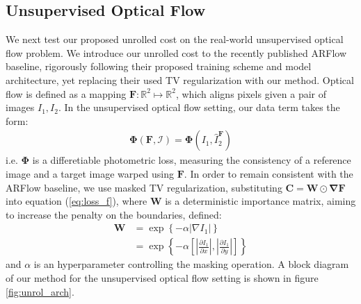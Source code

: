 \documentclass[10pt,twocolumn,letterpaper]{article}
\begin{document}
\subsection{Unsupervised Optical Flow} \label{sec:of}
We next test our proposed unrolled cost on the real-world unsupervised optical flow problem. We introduce our unrolled cost to the recently published ARFlow \cite{liu2020learning} baseline, rigorously following their proposed training scheme and model architecture, yet replacing their used TV regularization with our method. Optical flow is defined as a mapping $\mathbf{F}:\mathbb{R}^2 \mapsto \mathbb{R}^2$, which aligns pixels given a pair of images $I_1,I_2$. In the unsupervised optical flow setting, our data term takes the form:
\begin{equation}
\begin{aligned}
    \mathbf{\Phi}\left( \mathbf{F},\mathcal{I} \right) = \mathbf{\Phi}\left( I_1,\hat{I}_2^{\mathbf{F}} \right) \label{eq:data_flow}
\end{aligned}
\end{equation}
i.e. $\mathbf{\Phi}$ is a differetiable photometric loss, measuring the consistency of a reference image and a target image warped using $\mathbf{F}$. In order to remain consistent with the ARFlow baseline, we use masked TV regularization, substituting $\mathbf{C=W\odot\nabla F}$ into equation (\ref{eq:loss_f}), where $\mathbf{W}$ is a deterministic importance matrix, aiming to increase the penalty on the boundaries, defined: 
\begin{equation} \label{eq:mask}
\begin{aligned}
    \mathbf{W}&=\exp\left\{-\alpha|\nabla I_1|\right\} \\
    &=\exp\left\{-\alpha\left[\left|\frac{\partial  I_1}{\partial x}\right|,\left|\frac{\partial I_1}{\partial y} \right|\right]\right\}
\end{aligned}
\end{equation}
and $\alpha$ is an hyperparameter controlling the masking operation. A block diagram of our method for the unsupervised optical flow setting is shown in figure \ref{fig:unrol_arch}.
\end{document}
